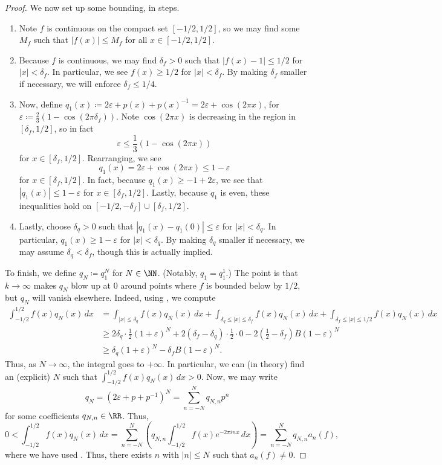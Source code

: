 \documentclass[notes.tex]{subfiles}
\begin{document}
\begin{proof}
	We now set up some bounding, in steps.
	\begin{enumerate}
		\item Note $f$ is continuous on the compact set $[-1/2,1/2]$, so we may find some $M_f$ such that $|f(x)|\le M_f$ for all $x\in[-1/2,1/2]$.
		\item Because $f$ is continuous, we may find $\delta_f>0$ such that $|f(x)-1|\le1/2$ for $|x|<\delta_f$. In particular, we see $f(x)\ge1/2$ for $|x|<\delta_f$. By making $\delta_f$ smaller if necessary, we will enforce $\delta_f\le1/4$.
		\item Now, define $q_1(x)\coloneqq2\varepsilon+p(x)+p(x)^{-1}=2\varepsilon+\cos(2\pi x)$, for $\varepsilon\coloneqq\frac23(1-\cos(2\pi\delta_f))$. Note $\cos(2\pi x)$ is decreasing in the region in $[\delta_f,1/2]$, so in fact
		\[\varepsilon\le\frac13(1-\cos(2\pi x))\]
		for $x\in[\delta_f,1/2]$. Rearranging, we see
		\[q_1(x)=2\varepsilon+\cos(2\pi x)\le1-\varepsilon\]
		for $x\in[\delta_f,1/2]$. In fact, because $q_1(x)\ge-1+2\varepsilon$, we see that $|q_1(x)|\le1-\varepsilon$ for $x\in[\delta_f,1/2]$. Lastly, because $q_1$ is even, these inequalities hold on $[-1/2,-\delta_f]\cup[\delta_f,1/2]$.
		\item Lastly, choose $\delta_q>0$ such that $|q_1(x)-q_1(0)|\le\varepsilon$ for $|x|<\delta_q$. In particular, $q_1(x)\ge1-\varepsilon$ for $|x|<\delta_q$. By making $\delta_q$ smaller if necessary, we may assume $\delta_q<\delta_f$, though this is actually implied.
	\end{enumerate}
	To finish, we define $q_N\coloneqq q_1^N$ for $N\in\NN$. (Notably, $q_1=q_1^1$.) The point is that $k\to\infty$ makes $q_N$ blow up at $0$ around points where $f$ is bounded below by $1/2$, but $q_N$ will vanish elsewhere. Indeed, using , we compute
	\begin{align*}
		\int_{-1/2}^{1/2}f(x)q_N(x)\,dx &= \int_{|x|\le\delta_q}f(x)q_N(x)\,dx+\int_{\delta_q\le|x|\le\delta_f}f(x)q_N(x)\,dx+\int_{\delta_f\le|x|\le1/2}f(x)q_N(x)\,dx \\
		&\ge2\delta_q\cdot\frac12\left(1+\varepsilon\right)^N+2(\delta_f-\delta_q)\cdot\frac12\cdot0-2\left(\frac12-\delta_f\right)B\left(1-\varepsilon\right)^N \\
		&\ge\delta_q\left(1+\varepsilon\right)^N-\delta_fB(1-\varepsilon)^N.
	\end{align*}
	Thus, as $N\to\infty$, the integral goes to $+\infty$. In particular, we can (in theory) find an (explicit) $N$ such that $\int_{-1/2}^{1/2}f(x)q_N(x)\,dx>0$. Now, we may write
	\[q_N=\left(2\varepsilon+p+p^{-1}\right)^N=\sum_{n=-N}^Nq_{N,n}p^n\]
	for some coefficients $q_{N,n}\in\RR$. Thus,
	\[0<\int_{-1/2}^{1/2}f(x)q_N(x)\,dx=\sum_{n=-N}^N\left(q_{N,n}\int_{-1/2}^{1/2}f(x)e^{-2\pi inx}\,dx\right)=\sum_{n=-N}^Nq_{N,n}a_n(f),\]
	where we have used . Thus, there exists $n$ with $|n|\le N$ such that $a_n(f)\ne0$.
\end{proof}
\end{document}
